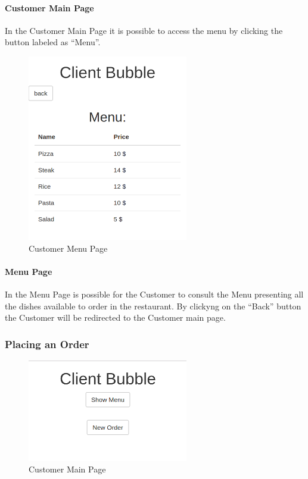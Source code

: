 \paragraph{Customer Main Page}
In the Customer Main Page it is possible to access the menu by clicking the button labeled as ``Menu''.
\begin{figure}[H]
	\centering
	\includegraphics[width=7cm]{../../documenti/UserManualDemo/demo_screens/client_menu.png}
	\caption{Customer Menu Page}
\end{figure}
\paragraph{Menu Page }
In the Menu Page is possible for the Customer to consult the Menu presenting all the dishes available to order in the restaurant.
By clickyng on the ``Back'' button the Customer will be redirected to the Customer main page.

\subsubsection{Placing an Order}
\begin{figure}[H]
	\centering
	\includegraphics[width=7cm]{../../documenti/UserManualDemo/demo_screens/client_main.png}
	\caption{Customer Main Page}
\end{figure}
